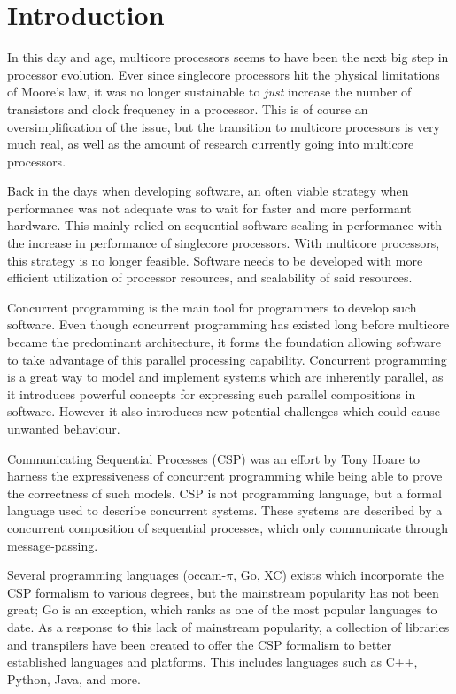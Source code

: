 
\chapter{Introduction}
\label{ch:introduction}

In this day and age, multicore processors seems to have been the next big step in processor evol\-ution. Ever since singlecore processors hit the physical limitations of Moore's law, it was no longer sustainable to \textit{just} increase the number of transistors and clock frequency in a processor. This is of course an oversimplification of the issue, but the transition to multicore processors is very much real, as well as the amount of research currently going into multicore processors.

Back in the days when developing software, an often viable strategy when performance was not adequate was to wait for faster and more performant hardware. This mainly relied on sequential software scaling in performance with the increase in performance of singlecore processors. With multicore processors, this strategy is no longer feasible. Software needs to be developed with more efficient utilization of processor resources, and scalability of said resources. 

Concurrent programming is the main tool for programmers to develop such software. Even though concurrent programming has existed long before multicore became the predominant architecture, it forms the foundation allowing software to take advantage of this parallel processing capability. Concurrent programming is a great way to model and implement systems which are inherently parallel, as it introduces powerful concepts for expressing such parallel compositions in software. However it also introduces new potential challenges which could cause unwanted behaviour.

Communicating Sequential Processes (CSP) was an effort by Tony Hoare to harness the expressiveness of concurrent programming while being able to prove the correctness of such models. CSP is not programming language, but a formal language used to describe concurrent systems. These systems are described by a concurrent composition of sequential processes, which only communicate through message-passing.

Several programming languages (occam-$\pi$, Go, XC) exists which incorporate the CSP formalism to various degrees, but the mainstream popularity has not been great; Go is an exception, which ranks as one of the most popular languages to date. As a response to this lack of mainstream popularity, a collection of libraries and transpilers have been created to offer the CSP formalism to better established languages and platforms. This includes languages such as C++, Python, Java, and more. 

